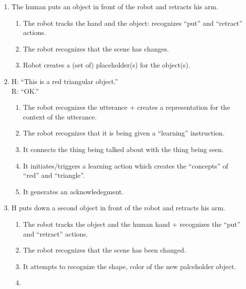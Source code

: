 \documentclass{article}
\begin{document}
\begin{enumerate}
\item \label{lvl2:step1} The human puts an object in front of the
  robot and retracts his arm.
  \begin{enumerate}
  \item \label{lvl2:step1:detail0} The robot tracks the hand and the
    object: recognizes ``put'' and ``retract'' actions.
  \item \label{lvl2:step1:detail1} The robot recognizes that the scene
    has changes.
  \item \label{lvl2:step1:detail2} Robot creates a (set of)
    placeholder(s) for the object(s).
  \end{enumerate}
  
\item \label{lvl2:step2} 
  H: ``This is a red triangular object.''\\
  R: ``OK.''
  \begin{enumerate}
  \item \label{lvl2:step2:detail} The robot recognizes the utterance +
    creates a representation for the context of the utterance.
  \item \label{lvl2:step2:detail2} The robot recognizes that it is
    being given a ``learning'' instruction.
  \item \label{lvl2:step2:detail3} It connects the thing being talked
    about with the thing being seen.
  \item \label{lvl2:step2:detail4} It initiates/triggers a learning
    action which creates the ``concepts'' of ``red'' and ``triangle''.
  \item \label{lvl2:step2:detail5} It generates an acknowledegment.
  \end{enumerate}

\item \label{lvl2:step3} H puts down a second object in front of the
  robot and retracts his arm.
  \begin{enumerate}
  \item \label{lvl2:step3:detail1} The robot tracks the object and the
    human hand + recognizes the ``put'' and ``retract'' actions.
  \item \label{lvl2:step3:detail2} The robot recognizes that the scene
    has been changed.
  \item \label{lvl2:step3:detail3} It attempts to recognize the shape,
    color of the new palceholder object.
  \item \label{lvl2:step3:detail4} 
  \end{enumerate}


\end{enumerate}
\end{document}

